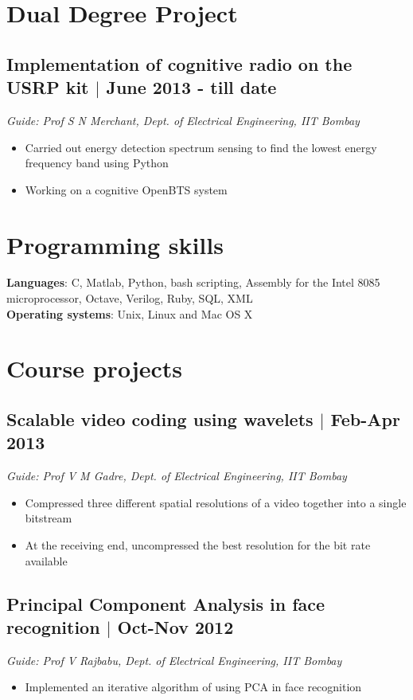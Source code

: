 \documentclass[11pt]{article}
\begin{document}
\setlength{\parindent}{0pt}


\vspace*{5\baselineskip}

\section*{Dual Degree Project}
\subsection*{Implementation of cognitive radio on the USRP kit $\vert$  June 2013 - till date}
\emph{Guide: Prof S N Merchant, Dept. of Electrical Engineering, IIT Bombay} 
\begin{itemize}
\item Carried out energy detection spectrum sensing to find the lowest energy frequency band  using Python
\item Working on a cognitive OpenBTS system 
\end{itemize}

\section*{Programming skills}
\textbf{Languages}: C, Matlab, Python, bash scripting, Assembly for the Intel 8085 microprocessor, Octave, Verilog, Ruby, SQL, XML  \\
\textbf{Operating systems}: Unix, Linux and Mac OS X


\section*{Course projects}
\subsection*{Scalable video coding using wavelets $\vert$  Feb-Apr 2013}
\emph{Guide: Prof V M Gadre, Dept. of Electrical Engineering, IIT Bombay} 
\begin{itemize} 
\item Compressed three different spatial resolutions of a video together into a single bitstream  
\item At the receiving end, uncompressed the best resolution for the bit rate available 
\end{itemize}

\subsection*{Principal Component Analysis in face recognition $\vert$  Oct-Nov 2012} 
\emph{Guide: Prof V Rajbabu, Dept. of Electrical Engineering, IIT Bombay}  
\begin{itemize}
\item Implemented an iterative algorithm of using PCA in face recognition  
\end{itemize}
\end{document}
